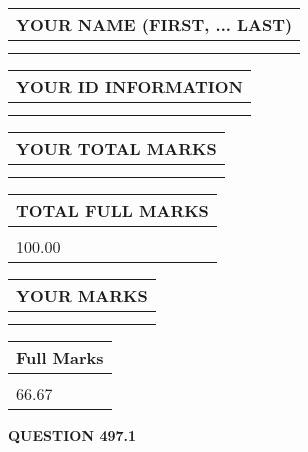 \documentclass{ctexart}
\begin{document}
   
   
   
\newpage 
\setcounter{page}{ 
   497001 } 
   
   
   
   
\noindent\begin{tabular}{|l|}
\hline
YOUR NAME (FIRST, ... LAST)  \\
\hline
 \\ 
 \\ 
\hline
\end{tabular}
\hspace{0.05in} \begin{tabular}{|l|}
\hline
 YOUR   ID   INFORMATION  \\
\hline
 \\ 
 \\ 
\hline
\end{tabular}
   
   
\vspace{0.2in}\noindent\begin{tabular}{|l|}
\hline
YOUR TOTAL MARKS  \\
\hline
 \\ 
 \\ 
\hline
\end{tabular}
\hspace{0.05in} \begin{tabular}{|l|}
\hline
TOTAL FULL MARKS  \\
\hline
 \\ 
100.00 \\
\hline
\end{tabular}
   
   
 \vspace{0.2in}
 
 
 
 
   
   
  
\vspace{0.2in}
  
\noindent\begin{tabular}{|l|}
\hline
 YOUR MARKS  \\
\hline
 \\ 
 \\ 
\hline
\end{tabular}
\hspace{0.05in} \begin{tabular}{|l|}
\hline
 Full Marks  \\
\hline
 \\ 
66.67 \\
\hline
\end{tabular}
{\textbf{\Large{QUESTION
497.1 
}}}
  
\end{document}
